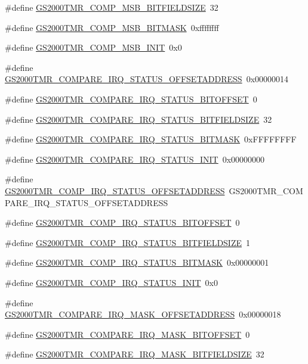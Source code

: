 \begin{DoxyCompactItemize}
\#define \hyperlink{a00556_ad926d0f2550a0873491c2570a16bbaa9}{GS2000TMR\_\-COMP\_\-MSB\_\-BITFIELDSIZE}~32
\item 
\#define \hyperlink{a00556_a3918f6453238207bb3affb2537188f31}{GS2000TMR\_\-COMP\_\-MSB\_\-BITMASK}~0xffffffff
\item 
\#define \hyperlink{a00556_a5926a318c5d0c36d094cbc4d2e36acf5}{GS2000TMR\_\-COMP\_\-MSB\_\-INIT}~0x0
\item 
\#define \hyperlink{a00556_a9a587caec08ebabc7f63e8b0bb17e00c}{GS2000TMR\_\-COMPARE\_\-IRQ\_\-STATUS\_\-OFFSETADDRESS}~0x00000014
\item 
\#define \hyperlink{a00556_a862991c04c90921bc313ec984e7f1f61}{GS2000TMR\_\-COMPARE\_\-IRQ\_\-STATUS\_\-BITOFFSET}~0
\item 
\#define \hyperlink{a00556_a0c7f823ffc8e1c09387fe2de4d884f26}{GS2000TMR\_\-COMPARE\_\-IRQ\_\-STATUS\_\-BITFIELDSIZE}~32
\item 
\#define \hyperlink{a00556_a4daa8df4710e943f477d0abbd6f525a7}{GS2000TMR\_\-COMPARE\_\-IRQ\_\-STATUS\_\-BITMASK}~0xFFFFFFFF
\item 
\#define \hyperlink{a00556_a84e0b2d1441c5787e4ae1de5c47339d7}{GS2000TMR\_\-COMPARE\_\-IRQ\_\-STATUS\_\-INIT}~0x00000000
\item 
\#define \hyperlink{a00556_a7850e81ec8479d2d79bc8303134a2a7e}{GS2000TMR\_\-COMP\_\-IRQ\_\-STATUS\_\-OFFSETADDRESS}~GS2000TMR\_\-COMPARE\_\-IRQ\_\-STATUS\_\-OFFSETADDRESS
\item 
\#define \hyperlink{a00556_a4ff2dff1693c851ecbe9ddd57b9114e8}{GS2000TMR\_\-COMP\_\-IRQ\_\-STATUS\_\-BITOFFSET}~0
\item 
\#define \hyperlink{a00556_ae53d08115596ed95f56941daf1748000}{GS2000TMR\_\-COMP\_\-IRQ\_\-STATUS\_\-BITFIELDSIZE}~1
\item 
\#define \hyperlink{a00556_a1f2e56903e7c9b48da9753e0e3220edb}{GS2000TMR\_\-COMP\_\-IRQ\_\-STATUS\_\-BITMASK}~0x00000001
\item 
\#define \hyperlink{a00556_a48078a6a44d66c32b63e06a86b63e44a}{GS2000TMR\_\-COMP\_\-IRQ\_\-STATUS\_\-INIT}~0x0
\item 
\#define \hyperlink{a00556_a0f064871e3d1c400f5fa258c77565239}{GS2000TMR\_\-COMPARE\_\-IRQ\_\-MASK\_\-OFFSETADDRESS}~0x00000018
\item 
\#define \hyperlink{a00556_a5dd432e25192a858dfc202709aa0e70a}{GS2000TMR\_\-COMPARE\_\-IRQ\_\-MASK\_\-BITOFFSET}~0
\item 
\#define \hyperlink{a00556_a3f4c781f3229f84ac3d028b383362804}{GS2000TMR\_\-COMPARE\_\-IRQ\_\-MASK\_\-BITFIELDSIZE}~32

\end{DoxyCompactItemize}

